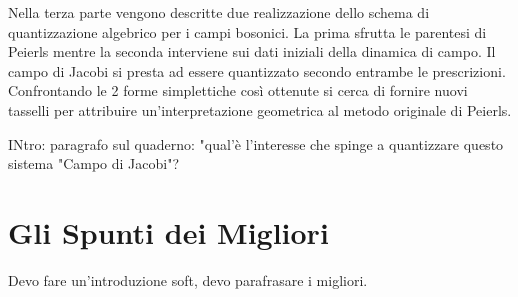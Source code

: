 \documentclass[Main]{subfiles}
\begin{document}
Nella terza parte vengono descritte due  realizzazione dello schema di quantizzazione algebrico per i campi bosonici. La prima sfrutta le parentesi di Peierls mentre la seconda interviene sui dati iniziali della dinamica di campo.
\newline
Il campo di Jacobi si presta ad essere quantizzato secondo entrambe le prescrizioni.
Confrontando le 2 forme simplettiche così ottenute si cerca di fornire nuovi tasselli per attribuire un'interpretazione geometrica al metodo originale di Peierls.


	\begin{Warning}
	INtro: paragrafo sul quaderno: "qual'è l'interesse che spinge a quantizzare questo sistema "Campo di Jacobi"?
	\end{Warning}


\section{Gli Spunti dei Migliori}
Devo fare un'introduzione soft, devo parafrasare i migliori.
\end{document}
